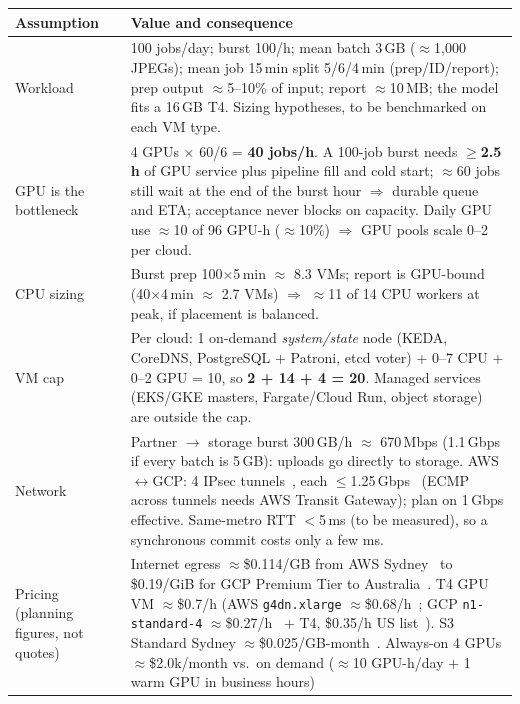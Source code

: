 \documentclass[10pt,a4paper]{article}
\begin{document}
\begin{table}[H]\centering\footnotesize
\begin{tabularx}{\linewidth}{@{}L{2.6cm}Y@{}}
\toprule
\textbf{Assumption} & \textbf{Value and consequence} \\ \midrule
Workload & 100 jobs/day; burst 100/h; mean batch 3\,GB ($\approx$1{,}000 JPEGs); mean job 15\,min split
  5/6/4\,min (prep/ID/report); prep output $\approx$5--10\% of input; report $\approx$10\,MB; the model fits a 16\,GB T4. Sizing
  hypotheses, to be benchmarked on each VM type. \\
GPU is the bottleneck & 4 GPUs $\times$ 60/6 = \textbf{40 jobs/h}. A 100-job burst needs $\geq$\textbf{2.5\,h} of
  GPU service plus pipeline fill and cold start; $\approx$60 jobs still wait at the end of the burst hour
  $\Rightarrow$ durable queue and ETA; acceptance never blocks on capacity. Daily GPU use $\approx$10 of
  96 GPU-h ($\approx$10\%) $\Rightarrow$ GPU pools scale 0--2 per cloud. \\
CPU sizing & Burst prep 100$\times$5\,min $\approx$ 8.3 VMs; report is GPU-bound (40$\times$4\,min $\approx$ 2.7 VMs)
  $\Rightarrow$ $\approx$11 of 14 CPU workers at peak, if placement is balanced. \\
VM cap & Per cloud: 1 on-demand \emph{system/state} node (KEDA, CoreDNS, PostgreSQL + Patroni, etcd voter)
  + 0--7 CPU + 0--2 GPU = 10, so \textbf{2 + 14 + 4 = 20}. Managed services (EKS/GKE masters,
  Fargate/Cloud Run, object storage) are outside the cap. \\
Network & Partner $\rightarrow$ storage burst 300\,GB/h $\approx$ 670\,Mbps (1.1\,Gbps if every batch is
  5\,GB): uploads go directly to storage. AWS$\leftrightarrow$GCP: 4 IPsec tunnels~\cite{gcp-havpn}, each $\leq$1.25\,Gbps~\cite{aws-vpn-quotas}
  (ECMP across tunnels needs AWS Transit Gateway); plan on 1\,Gbps effective. Same-metro RTT $<$5\,ms (to be
  measured), so a synchronous commit costs only a few ms. \\
Pricing (planning figures, not quotes) & Internet egress $\approx$\$0.114/GB from AWS Sydney~\cite{aws-egress-au} to
  \$0.19/GiB for GCP Premium Tier to Australia~\cite{gcp-net-pricing}. T4 GPU VM $\approx$\$0.7/h (AWS
  \texttt{g4dn.xlarge} $\approx$\$0.68/h~\cite{doit-g4dn}; GCP \texttt{n1-standard-4} $\approx$\$0.27/h~\cite{holori-n1} + T4,
  \$0.35/h US list~\cite{gcp-gpu-pricing}). S3 Standard Sydney $\approx$\$0.025/GB-month~\cite{s3-pricing}.
  Always-on 4 GPUs $\approx$\$2.0k/month vs.\ on demand ($\approx$10 GPU-h/day + 1 warm GPU in business hours)

\end{tabularx}
\end{table}
\end{document}
